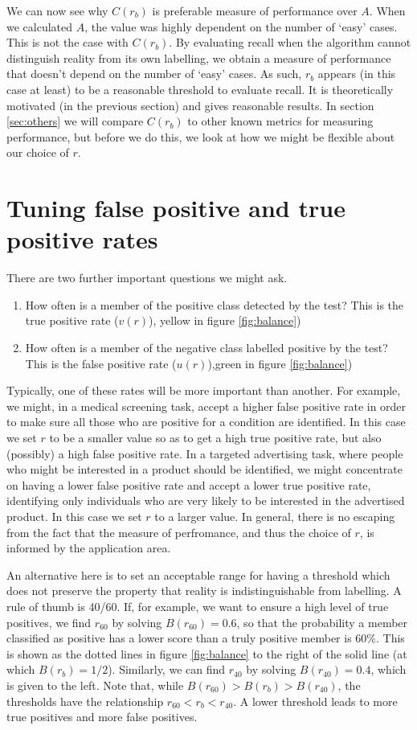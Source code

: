 \documentclass{article}
\begin{document}
We can now see why $C(r_b)$ is preferable measure of performance over $A$. When we calculated $A$, the value was highly dependent on the number of `easy' cases. This is not the case with $C(r_b)$. By evaluating recall when the algorithm cannot distinguish reality from its own labelling, we obtain a measure of performance that doesn't depend on the number of `easy' cases. As such, $r_b$ appears (in this case at least) to be a reasonable threshold to evaluate recall. It is theoretically motivated (in the previous section) and gives reasonable results. In section \ref{sec:others} we will compare $C(r_b)$ to other known metrics for measuring performance, but before we do this, we look at how we might be flexible about our choice of $r$. 


\section{Tuning false positive and true positive rates}

There are two further important questions we might ask. 
\begin{enumerate}
\item How	often is a member of the positive class detected by the test? This is the true positive rate ($v(r)$), yellow in figure \ref{fig:balance})
\item How often is a member of the negative class labelled positive by the test? This is the false positive rate ($u(r)$),green in figure \ref{fig:balance})
\end{enumerate}
Typically, one of these rates will be more important than another. For example, we might, in a medical screening task, accept a higher false positive rate in order to make sure all those who are positive for a condition are identified. In this case we set $r$ to be a smaller value so as to get a high true positive rate, but also (possibly) a high false positive rate.  In a targeted advertising task, where people who might be interested in a product should be identified, we might concentrate on having a lower false positive rate and accept a lower true positive rate, identifying only individuals who are very likely to be interested in the advertised product. In this case we set $r$ to a larger value. In general, there is no escaping from the fact that the measure of perfromance, and thus the choice of $r$, is informed by the application area.

An alternative here is to set an acceptable range for having a threshold which does not preserve the property that reality is indistinguishable from labelling. A rule of thumb  is 40/60. If, for example, we want to ensure a high level of true positives, we find $r_{60}$ by solving $B(r_{60})=0.6$, so that the probability a member classified as positive has a lower score than a truly positive member is 60\%. This is shown as the dotted lines in figure \ref{fig:balance} to the right of the solid line (at which $B(r_{b})=1/2$). Similarly, we can find $r_{40}$ by solving $B(r_{40})=0.4$, which is given to the left. Note that, while $B(r_{60})>B(r_b)>B(r_{40})$, the thresholds have the relationship $r_{60}<r_b<r_{40}$. A lower threshold leads to more true positives and more false positives. 
\end{document}
